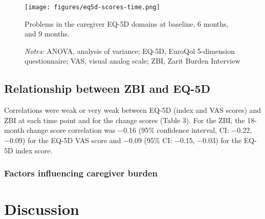 \documentclass[12pt]{article}
\begin{document}
\hspace{1em}
\begin{figure}[H]
    \centering
    \texttt{[image: figures/eq5d-scores-time.png]}
    \caption{Problems in the caregiver EQ-5D domains at baseline, 6 months, and 9 months.}
    \label{fig:eq5d-scores-time}
    \caption*{\footnotesize \textit{Notes:} ANOVA, analysis of variance; EQ-5D, EuroQol 5-dimension questionnaire; VAS, visual analog scale; ZBI, Zarit Burden Interview}
\end{figure}

\subsection{Relationship between ZBI and EQ-5D}
Correlations were weak or very weak between EQ-5D (index and VAS scores) and ZBI at each time point and for the change scores (Table 3). For the ZBI, the 18-month change score correlation was −0.16 (95\% confidence interval, CI: −0.22, −0.09) for the EQ-5D VAS score and −0.09 (95\% CI: −0.15, −0.03) for the EQ- 5D index score.


\subsubsection{Factors influencing caregiver burden}

\section{Discussion}

\clearpage
\newrefcontext[sorting=nyt]
\printbibliography
\end{document}
